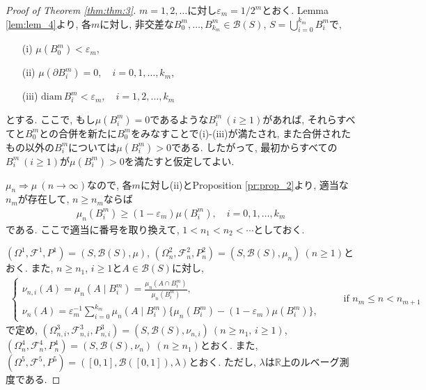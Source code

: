 \begin{proof}[Proof of Theorem \ref{thm:thm:3}]
    $m=1,2,\dots$に対し$\varepsilon_m=1/2^m$とおく.
    Lemma \ref{lem:lem_4}より, 各$m$に対し, 非交差な$B^m_0,\dots,B^m_{k_m}\in\mathcal{B}(S)$, $S=\bigcup_{i=0}^{k_m}B_i^m$で,
    \begin{itemize}
        \item[(i)] $\mu(B^m_0)<\varepsilon_m$,
        \item[(ii)] $\mu(\partial B^m_i)=0, \quad i=0,1,\dots,k_m$,
        \item[(iii)] $\textrm{diam}\,B^m_i<\varepsilon_m, \quad i=1,2,\dots,k_m$
    \end{itemize}
    とする.
    ここで, もし$\mu(B^m_i)=0$であるような$B^m_i~(i\geq 1)$があれば, それらすべてと$B^m_0$との合併を新たに$B^m_0$をみなすことで(i)-(iii)が満たされ, また合併されたもの以外の$B^m_i$については$\mu(B^m_i)>0$である.
    したがって, 最初からすべての$B^m_i~(i\geq 1)$が$\mu(B^m_i)>0$を満たすと仮定してよい.

    $\mu_n\Rightarrow\mu~(n\to\infty)$なので, 各$m$に対し(ii)とProposition \ref{pr:prop_2}より, 適当な$n_m$が存在して, $n\geq n_m$ならば
    \begin{align*}
        \mu_n(B^m_i) \geq (1-\varepsilon_m)\mu(B^m_i), \quad i=0,1,\dots,k_m
    \end{align*}
    である.
    ここで適当に番号を取り換えて, $1<n_1<n_2<\cdots$としておく.

    $(\Omega^1,\mathcal{F}^1,P^1)=(S,\mathcal{B}(S),\mu)$, $(\Omega^2_n,\mathcal{F}^2_n,P^2_n)=(S,\mathcal{B}(S),\mu_n)~(n\geq 1)$とおく.
    また, $n\geq n_1$, $i\geq 1$と$A\in\mathcal{B}(S)$に対し,
    \begin{align*}
        \begin{cases}
            \displaystyle \nu_{n,i}(A) = \mu_n(A \mid B^m_i)= \frac{\mu_n(A\cap B^m_i)}{\mu_n(B^m_i)}, \\[.5em]
            \displaystyle \nu_n(A) = \varepsilon_m^{-1} \sum_{i=0}^{k_m} \mu_n(A\mid B^m_i)\{\mu_n(B^m_i)-(1-\varepsilon_m)\mu(B^m_i)\},
        \end{cases}
        \qquad ~\text{if $n_m\leq n < n_{m+1}$}
    \end{align*}
    で定め, $(\Omega^3_{n,i},\mathcal{F}^3_{n,i},P^3_{n,i})=(S,\mathcal{B}(S),\nu_{n,i})~(n\geq n_1,\,i\geq 1)$, $(\Omega^4_n,\mathcal{F}^4_n,P^4_n)=(S,\mathcal{B}(S),\nu_{n})~(n\geq n_1)$とおく.
    また, $(\Omega^5,\mathcal{F}^5,P^5)=([0,1],\mathcal{B}([0,1]),\lambda)$とおく.
    ただし, $\lambda$は$\mathbb{R}$上のルベーグ測度である.


\end{proof}
